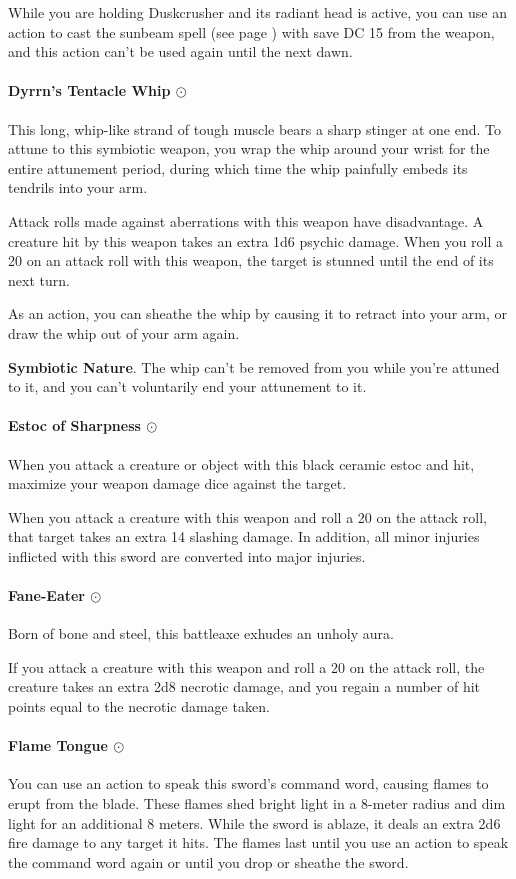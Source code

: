         While you are holding Duskcrusher and its radiant head is active, you can use an action to cast the sunbeam spell (see page \pageref{spell:sunbeam}) with save DC 15 from the weapon, and this action can't be used again until the next dawn.
    \paragraph{Dyrrn's Tentacle Whip $\odot$}
        This long, whip-like strand of tough muscle bears a sharp stinger at one end.
        To attune to this symbiotic weapon, you wrap the whip around your wrist for the entire attunement period, during which time the whip painfully embeds its tendrils into your arm.

        Attack rolls made against aberrations with this weapon have disadvantage.
        A creature hit by this weapon takes an extra 1d6 psychic damage.
        When you roll a 20 on an attack roll with this weapon, the target is stunned until the end of its next turn.

        As an action, you can sheathe the whip by causing it to retract into your arm, or draw the whip out of your arm again.

        \textbf{Symbiotic Nature}.
        The whip can't be removed from you while you're attuned to it, and you can't voluntarily end your attunement to it.
    \paragraph{Estoc of Sharpness $\odot$}
        When you attack a creature or object with this black ceramic estoc and hit, maximize your weapon damage dice against the target.

        When you attack a creature with this weapon and roll a 20 on the attack roll, that target takes an extra 14 slashing damage.
        In addition, all minor injuries inflicted with this sword are converted into major injuries.
    \paragraph{Fane-Eater $\odot$}
        Born of bone and steel, this battleaxe exhudes an unholy aura.

        If you attack a creature with this weapon and roll a 20 on the attack roll, the creature takes an extra 2d8 necrotic damage, and you regain a number of hit points equal to the necrotic damage taken.
    \paragraph{Flame Tongue $\odot$}
        You can use an action to speak this sword's command word, causing flames to erupt from the blade.
        These flames shed bright light in a 8-meter radius and dim light for an additional 8 meters.
        While the sword is ablaze, it deals an extra 2d6 fire damage to any target it hits.
        The flames last until you use an action to speak the command word again or until you drop or sheathe the sword.
